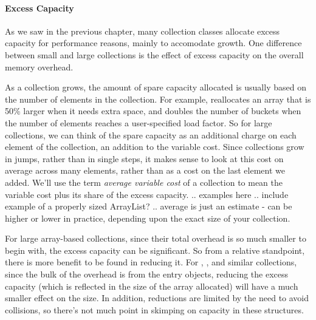 
\paragraph{Excess Capacity}

As we saw in the previous chapter, many collection
classes allocate excess capacity for performance reasons, mainly to accomodate
growth. One difference between small and large collections is the
effect of excess capacity on the overall memory overhead.  

As a collection grows, the amount of spare capacity allocated is usually based
on the number of elements in the collection. For example,  reallocates an array that is 50\% larger
when it needs extra space, and  doubles the number of buckets when the number of elements reaches a user-specified load factor. So for large collections, we can think of the spare capacity as an additional charge
on each element of the collection, an addition to the variable cost.
Since collections grow in jumps, rather than in single steps, it makes sense to look at this cost
on average across many elements, rather than as a cost on the last element we
added. We'll use the term \emph{average variable cost} of a collection to mean the variable cost
plus its share of the excess capacity.    .. examples here .. 
include example of a properly sized ArrayList? .. average is just an estimate - can be higher or lower in practice, depending
upon the exact size of your collection.

For large array-based collections, since their total overhead is
so much smaller to begin with, the excess capacity can be significant. So from a
relative standpoint, there is more benefit to be found in reducing it.  For
, , and similar collections, since the bulk of the overhead is from the entry objects,
reducing the excess capacity (which is
reflected in the size of the array allocated) will have a much smaller effect on
the size.  In addition, reductions are limited by the need to avoid
collisions, so there's not much point in skimping on capacity in these
structures.

